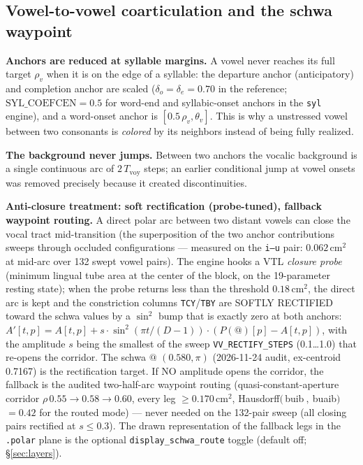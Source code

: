 \documentclass[11pt,a4paper]{article}
\begin{document}
\subsection{Vowel-to-vowel coarticulation and the schwa waypoint}\label{subsec:vv}

\textbf{Anchors are reduced at syllable margins.} A vowel never reaches
its full target \(\rho_v\) when it is on the edge of a syllable: the
departure anchor (anticipatory) and completion anchor are scaled
(\(\delta_o = \delta_e = 0.70\) in the reference;
\(\mathrm{SYL\_COEFCEN} = 0.5\) for word-end and syllabic-onset anchors in the
\texttt{syl} engine), and a word-onset anchor is
\([0.5\,\rho_v, \theta_v]\). This is why a unstressed vowel between two
consonants is \emph{colored} by its neighbors instead of being fully
realized.

\textbf{The background never jumps.} Between two anchors the vocalic
background is a single continuous arc of \(2\,T_{\mathrm{voy}}\) steps;
an earlier conditional jump at vowel onsets was removed precisely because
it created discontinuities.

\textbf{Anti-closure treatment: soft rectification (probe-tuned),
fallback waypoint routing.} A direct polar arc between two distant
vowels can close the vocal tract mid-transition (the superposition of
the two anchor contributions sweeps through occluded configurations ---
measured on the \texttt{i--u} pair: \(0.062\,\mathrm{cm^2}\) at
mid-arc over 132 swept vowel pairs). The engine hooks a VTL \emph{closure
probe} (minimum lingual tube area at the center of the block, on the
19-parameter resting state); when the probe returns less than the
threshold \(0.18\,\mathrm{cm^2}\), the direct arc is kept and the
constriction columns \texttt{TCY}/\texttt{TBY} are SOFTLY RECTIFIED
toward the schwa values by a \(\sin^2\) bump that is exactly zero at
both anchors: \(A'[t,p] = A[t,p] + s\cdot\sin^2(\pi t/(D{-}1))\cdot
(P(@)[p] - A[t,p])\), with the amplitude \(s\) being the smallest of
the sweep \texttt{VV\_RECTIFY\_STEPS} (0.1\ldots1.0) that re-opens the
corridor. The schwa \(@\) \((0.580, \pi)\) (2026-11-24 audit,
ex-centroid 0.7167) is the rectification target. If NO amplitude opens
the corridor, the fallback is the audited two-half-arc waypoint routing
(quasi-constant-aperture corridor \(\rho\,0.55 \to 0.58 \to 0.60\),
every leg \(\ge 0.170\,\mathrm{cm^2}\), Hausdorff\((\,\)buib\(~{},~{}\)buaib\()\)
\(= 0.42\) for the routed mode) --- never needed on the 132-pair sweep
(all closing pairs rectified at \(s \le 0.3\)). The drawn
representation of the fallback legs in the \texttt{.polar} plane is the
optional \texttt{display\_schwa\_route} toggle (default off;
\S\ref{sec:layers}).
\end{document}
